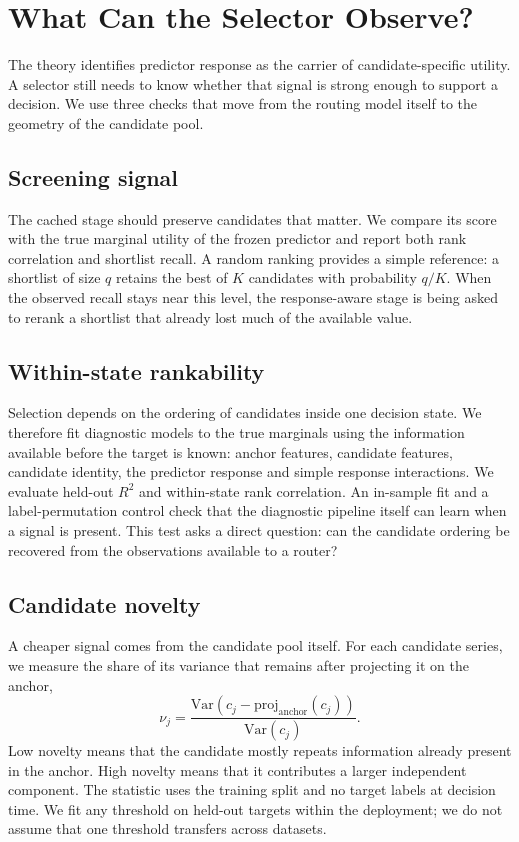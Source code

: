 \section{What Can the Selector Observe?}
\label{sec:diagnostics}

The theory identifies predictor response as the carrier of candidate-specific
utility. A selector still needs to know whether that signal is strong enough to
support a decision. We use three checks that move from the routing model itself
to the geometry of the candidate pool.

\subsection{Screening signal}

The cached stage should preserve candidates that matter. We compare its score
with the true marginal utility of the frozen predictor and report both rank
correlation and shortlist recall. A random ranking provides a simple reference:
a shortlist of size $q$ retains the best of $K$ candidates with probability
$q/K$. When the observed recall stays near this level, the response-aware stage
is being asked to rerank a shortlist that already lost much of the available
value.

\subsection{Within-state rankability}

Selection depends on the ordering of candidates inside one decision state. We
therefore fit diagnostic models to the true marginals using the information
available before the target is known: anchor features, candidate features,
candidate identity, the predictor response and simple response interactions.
We evaluate held-out $R^2$ and within-state rank correlation. An in-sample fit
and a label-permutation control check that the diagnostic pipeline itself can
learn when a signal is present. This test asks a direct question: can the
candidate ordering be recovered from the observations available to a router?

\subsection{Candidate novelty}

A cheaper signal comes from the candidate pool itself. For each candidate
series, we measure the share of its variance that remains after projecting it on
the anchor,
\begin{equation}
 \nu_j =
 \frac{\mathrm{Var}\!\left(c_j-
 \mathrm{proj}_{\mathrm{anchor}}(c_j)\right)}
 {\mathrm{Var}(c_j)} .
 \label{eq:novelty}
\end{equation}
Low novelty means that the candidate mostly repeats information already present
in the anchor. High novelty means that it contributes a larger independent
component. The statistic uses the training split and no target labels at
decision time. We fit any threshold on held-out targets within the deployment;
we do not assume that one threshold transfers across datasets.

